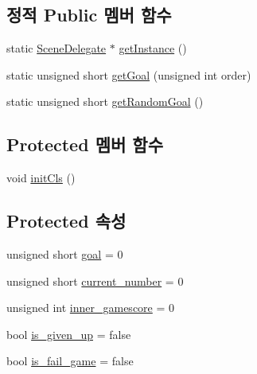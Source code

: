 \subsection*{정적 Public 멤버 함수}
\begin{DoxyCompactItemize}
\item 
static \hyperlink{classhsh_1_1_code_lady_j_j_y_1_1game2048_1_1_scene_delegate}{Scene\+Delegate} $\ast$ \hyperlink{classhsh_1_1_code_lady_j_j_y_1_1game2048_1_1_scene_delegate_a332a574da455fb687b5d283399a6976c}{get\+Instance} ()
\item 
static unsigned short \hyperlink{classhsh_1_1_code_lady_j_j_y_1_1game2048_1_1_scene_delegate_a4b1f64a13b6816a657bc21bdc6a17c61}{get\+Goal} (unsigned int order)
\item 
static unsigned short \hyperlink{classhsh_1_1_code_lady_j_j_y_1_1game2048_1_1_scene_delegate_abb107cf268a50b3ebd9bd545c88a9a35}{get\+Random\+Goal} ()
\end{DoxyCompactItemize}
\subsection*{Protected 멤버 함수}
\begin{DoxyCompactItemize}
\item 
void \hyperlink{classhsh_1_1_code_lady_j_j_y_1_1game2048_1_1_scene_delegate_ab5504cff24fa2c916c0c6139aff67a4e}{init\+Cls} ()
\end{DoxyCompactItemize}
\subsection*{Protected 속성}
\begin{DoxyCompactItemize}
\item 
unsigned short \hyperlink{classhsh_1_1_code_lady_j_j_y_1_1game2048_1_1_scene_delegate_a837886106e5ac017e4f57d8f56943e20}{goal} = 0
\item 
unsigned short \hyperlink{classhsh_1_1_code_lady_j_j_y_1_1game2048_1_1_scene_delegate_af013ba6abf67944a36a117be7c97f0d3}{current\+\_\+number} = 0
\item 
unsigned int \hyperlink{classhsh_1_1_code_lady_j_j_y_1_1game2048_1_1_scene_delegate_af8e4687385133b732cc12f92d4118862}{inner\+\_\+gamescore} = 0
\item 
bool \hyperlink{classhsh_1_1_code_lady_j_j_y_1_1game2048_1_1_scene_delegate_a8ea6710e5c00d1af16c4566260c62501}{is\+\_\+given\+\_\+up} = false
\item 
bool \hyperlink{classhsh_1_1_code_lady_j_j_y_1_1game2048_1_1_scene_delegate_a73d468ae6105f774847049e83ea5cc61}{is\+\_\+fail\+\_\+game} = false
\end{DoxyCompactItemize}


